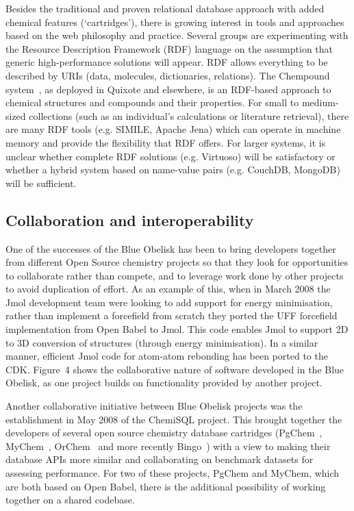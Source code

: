 \documentclass[10pt]{bmc_article}
\newenvironment{bmcformat}{\fussy\setboolean{publ}{true}}{\fussy}
\begin{document}
\begin{bmcformat}
Besides the traditional and proven relational database approach with
added chemical features (`cartridges'), there is growing
interest in tools and approaches based on the web philosophy and
practice. Several groups are experimenting with 
the Resource Description Framework (RDF) language
on the assumption that generic high-performance solutions will appear.
RDF allows everything to be described by
URIs (data, molecules, dictionaries, relations). The Chempound
system~\cite{Chempound},
as deployed in
Quixote and elsewhere, is an RDF-based approach to chemical structures
and compounds and their properties. For small
to medium-sized collections (such as an individual's calculations or
literature retrieval), there are many RDF tools
(e.g. SIMILE, Apache Jena) which can operate in machine memory and provide
the flexibility that RDF offers. For larger
systems, it is unclear whether complete RDF solutions (e.g. Virtuoso)
will be satisfactory or whether a hybrid system
based on name-value pairs (e.g. CouchDB, MongoDB) will be sufficient.

  \subsection*{Collaboration and interoperability}

One of the successes of the Blue Obelisk has been to bring developers
together from different Open Source chemistry projects so that they
look for opportunities to collaborate rather than compete, and to
leverage work done by other projects to avoid duplication of effort.
As an example of this, when in March 2008 the Jmol development team
were looking to add support for energy minimisation, rather than
implement a forcefield from scratch they ported the UFF forcefield~\cite{Rappe:1992um}
implementation from Open Babel to Jmol. This code enables Jmol to
support 2D to 3D conversion of structures (through energy
minimisation). In a similar manner, efficient Jmol code for atom-atom rebonding
has been ported to the CDK. Figure~4 shows the collaborative nature of
software developed in the Blue Obelisk, as one project builds on
functionality provided by another project.

Another collaborative initiative between Blue Obelisk projects was the establishment in May 2008 of
the ChemiSQL project. This brought together the developers of several
open source chemistry database cartridges (PgChem~\cite{WebPgChem},
MyChem~\cite{WebMyChem}, OrChem~\cite{RijnbeekS10} and
more recently Bingo~\cite{WebBingo}) with a view to making their database APIs more
similar and collaborating on benchmark datasets for assessing
performance. For two of these projects, PgChem and MyChem, which are both based on
Open Babel, there is the additional possibility of working together on a shared
codebase.


\end{bmcformat}
\end{document}
